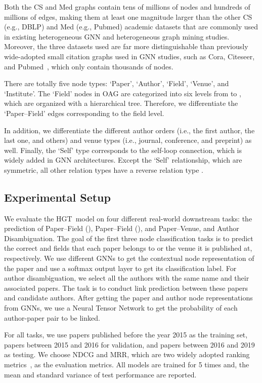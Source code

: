 \documentclass[sigconf]{acmart}
\theoremstyle{definition}
\newcommand{\short}{HGT}
\begin{document}
Both the CS and Med graphs contain tens of millions of nodes and hundreds of millions of edges, making them at least one magnitude larger than the other CS (e.g., DBLP) and Med (e.g., Pubmed) academic datasets that are commonly used in existing heterogeneous GNN and heterogeneous graph mining studies. 
Moreover, the three datasets used are far more distinguishable than previously wide-adopted small citation graphs used in GNN studies, such as Cora, Citeseer, and Pubmed~\cite{gcn,gat}, which only contain thousands of nodes. 


There are totally five node types: `Paper', `Author', `Field', `Venue', and `Institute'. 
The `Field' nodes in OAG are categorized into six levels from  to , which are organized with a hierarchical tree. Therefore, we differentiate the `Paper--Field' edges corresponding to the field level. 

In addition, we differentiate the different author orders (i.e., the first author, the last one, and others) and venue types (i.e., journal, conference, and preprint) as well. 
Finally, the `Self' type corresponds to the self-loop connection, which is widely added in GNN architectures. 
Except the `Self' relationship, which are symmetric, all other relation types  have a reverse relation type . 


\subsection{Experimental Setup}



We evaluate the \short\ model on four different real-world downstream tasks: the prediction of Paper--Field (), Paper--Field (), and Paper--Venue, and Author Disambiguation. 
The goal of the first three node classification tasks is to predict the correct  and  fields that each paper belongs to or the venue it is published at, respectively. 
We use different GNNs to get the contextual node representation of the paper and use a softmax output layer to get its classification label. 
For author disambiguation, we select all the authors with the same name and their associated papers. 
The task is to conduct link prediction between these papers and candidate authors. 
After getting the paper and author node representations from GNNs, we use a Neural Tensor Network to get the probability of each author-paper pair to be linked. 


For all tasks, we use papers published before the year 2015 as the training set, papers between 2015 and 2016 for validation, and papers between 2016 and 2019 as testing. 
We choose NDCG and MRR, which are two widely adopted ranking metrics~\cite{DBLP:books/daglib/0027504, DBLP:series/synthesis/2014Li}, as the evaluation metrics. 
All models are trained for 5 times and, the mean and standard variance of test performance are reported. 
\end{document}
